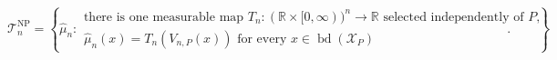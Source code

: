 \[
 \mathcal T_n^{\mathrm{NP}}
 =\left\{\widehat\mu_n:\begin{array}{l}
 \text{there is one measurable map }T_n:(\mathbb R\times[0,\infty))^n\to\mathbb R
 \text{ selected independently of }P,\\
 \widehat\mu_n(x)=T_n(V_{n,P}(x))
 \text{ for every }x\in\operatorname{bd}(\mathcal X_P)
 \end{array}\right\}.
\]